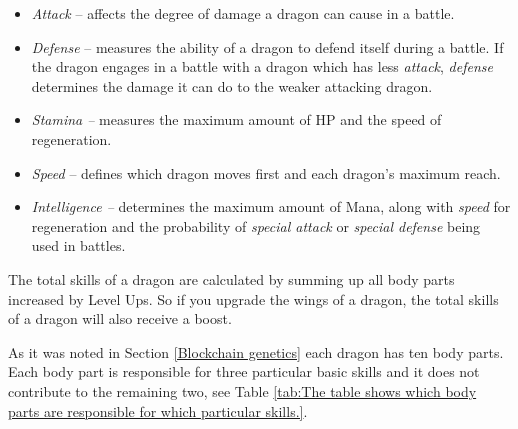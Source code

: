 \documentclass[12pt]{article}
\begin{document}
\begin{itemize}
	\item \textit{Attack} -- affects the degree of damage a dragon can cause in a battle.\par

	\item \textit{Defense} -- measures the ability of a dragon to defend itself during a battle. If the dragon engages in a battle with a dragon which has less \textit{attack}, \textit{defense} determines the damage it can do to the weaker attacking dragon.\par

	\item \textit{Stamina -- }measures the maximum amount of HP and the speed of regeneration.\par

	\item \textit{Speed} -- defines which dragon moves first and each dragon’s maximum reach.\par

	\item \textit{Intelligence -- }determines the maximum amount of Mana, along with \textit{speed} for regeneration and the probability of \textit{special attack} or \textit{special defense} being used in battles.
\end{itemize}\par

The total skills of a dragon are calculated by summing up all body parts increased by Level Ups. So if you upgrade the wings of a dragon, the total skills of a dragon will also receive a boost.\par

As it was noted in Section \ref{Blockchain genetics} each dragon has ten body parts. Each body part is responsible for three particular basic skills and it does not contribute to the remaining two, see  Table \ref{tab:The table shows which body parts are responsible for which particular skills.}.\par




\end{document}
